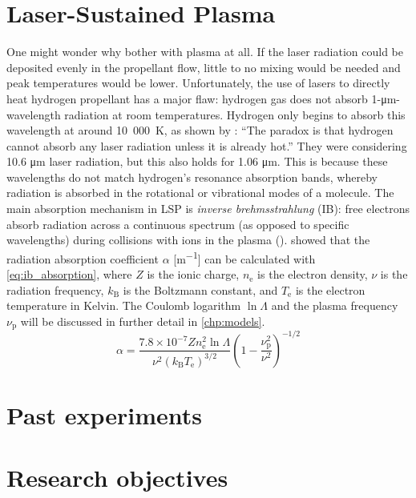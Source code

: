     \section{Laser-Sustained Plasma} \label{sec:background_lsp}
        One might wonder why bother with plasma at all. If the laser radiation could be deposited evenly in the propellant flow, little to no mixing would be needed and peak temperatures would be lower. Unfortunately, the use of lasers to directly heat hydrogen propellant has a major flaw: hydrogen gas does not absorb 1-\unit{\um}-wavelength radiation at room temperatures. Hydrogen only begins to absorb this wavelength at around 10~000~K, as shown by \textcite{glumbConceptsStatusLasersupported1984}: ``The paradox is that hydrogen cannot absorb any laser radiation unless it is already hot.'' They were considering 10.6 \unit{\um} laser radiation, but this also holds for 1.06 \unit{\um}. This is because these wavelengths do not match hydrogen's resonance absorption bands, whereby radiation is absorbed in the rotational or vibrational modes of a molecule. The main absorption mechanism in LSP is \emph{inverse brehmsstrahlung} (IB): free electrons absorb radiation across a continuous spectrum (as opposed to specific wavelengths) during collisions with ions in the plasma (\textcite{keeferLaserSustainedPlasmas1989}). \textcite{johnstonCorrectValuesHighfrequency1973} showed that the radiation absorption coefficient $\alpha$ [\unit{m^{-1}}] can be calculated with \autoref{eq:ib_absorption}, where $Z$ is the ionic charge, $n_\mathrm{e}$ is the electron density, $\nu$ is the radiation frequency, $k_\mathrm{B}$ is the Boltzmann constant, and $T_\mathrm{e}$ is the electron temperature in Kelvin. The Coulomb logarithm $\ln{\Lambda}$ and the plasma frequency $\nu_\mathrm{p}$ will be discussed in further detail in \autoref{chp:models}.
        \begin{equation}
            \alpha = \frac{7.8\times 10^{-7}Zn_\mathrm{e}^2\ln{\Lambda}}{\nu^2(k_\mathrm{B}T_\mathrm{e})^{3/2}} \left(1-\frac{\nu_\mathrm{p}^2}{\nu^2}\right)^{-1/2} \label{eq:ib_absorption}
        \end{equation}

    \section{Past experiments} \label{sec:background_exp}

    \section{Research objectives}